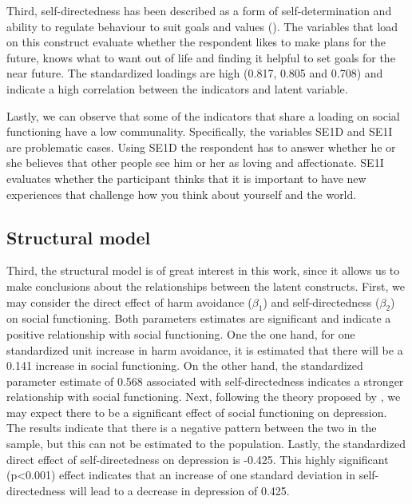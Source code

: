 \documentclass[11pt]{article}
\begin{document}
Third, self-directedness has been described as a form of self-determination and
ability to regulate behaviour to suit goals and values (\cite{tse2011}). The
variables that load on this construct evaluate whether the respondent likes to
make plans for the future, knows what to want out of life and finding it helpful
to set goals for the near future. The standardized loadings are high
(0.817, 0.805 and 0.708) and indicate a high correlation between the
indicators and latent variable.

Lastly, we can observe that some of the indicators that share a loading on social
functioning have a low communality. Specifically, the variables SE1D and SE1I
are problematic cases. Using SE1D the respondent has to answer whether he or she
believes that other people see him or her as loving and affectionate. SE1I
evaluates whether the participant thinks that it is important to have new
experiences that challenge how you think about yourself and the world.

\FloatBarrier
\subsection{Structural model}

Third, the structural model is of great interest in this work, since it allows us
to make conclusions about the relationships between the latent constructs.
First, we may consider the direct effect of harm avoidance ($\beta_1$) and
self-directedness ($\beta_2$) on social functioning. Both parameters estimates
are significant and indicate a positive relationship with social functioning.
One the one hand, for one standardized unit increase in harm avoidance, it is
estimated that there will be a 0.141 increase in social functioning. On the
other hand, the standardized parameter estimate of 0.568 associated with
self-directedness indicates a stronger relationship with social functioning.
Next, following the theory proposed by \cite{tse2011}, we may expect there to be
a significant effect of social functioning on depression. The results indicate 
that there is a negative pattern between the two in the sample, but this can not
be estimated to the population.
Lastly, the standardized direct effect of self-directedness on depression is
-0.425. This highly significant (p<0.001) effect indicates that an increase of
one standard deviation in self-directedness will lead to a decrease in depression
of 0.425.
\end{document}
